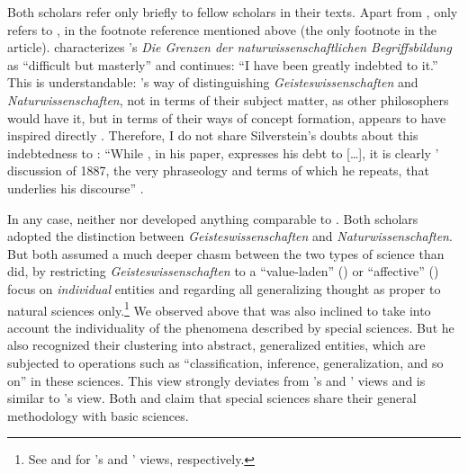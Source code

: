 \documentclass[output=paper]{langscibook}
\begin{document}
Both scholars refer only briefly to fellow scholars in their texts. Apart from {\Kroeber}, {\Sapir} only refers to {\Rickert}, in the footnote reference mentioned above (the only footnote in the article). {\Sapir} characterizes {\Rickert}'s \emph{Die Grenzen der naturwissenschaftlichen Begriffsbildung} as ``difficult but masterly'' and continues: ``I have been greatly indebted to it.'' This is understandable: {\Rickert}'s way of distinguishing \emph{Geisteswissenschaften} and \emph{Naturwissenschaften}, not in terms of their subject matter, as other philosophers would have it, but in terms of their ways of concept formation, appears to have inspired {\Sapir} directly \citep[cf.][]{Anchor1967}.  Therefore, I do not share Silverstein's doubts about this indebtedness to {\Rickert}: ``While {\Sapir}, in his paper, expresses his debt to {\Rickert} […], it is clearly {\Boas}' discussion of 1887, the very phraseology and terms of which he repeats, that underlies his discourse'' \citep[70, fn.5]{Silverstein1986}.\label{q:elffers:silversteinref}

In any case, neither {\Rickert} nor {\Boas} developed anything comparable to . Both scholars adopted the distinction between \emph{Geisteswissenschaf\-ten} and \emph{Naturwissenschaften}. But both assumed a much deeper chasm between the two types of science than {\Sapir} did, by restricting \emph{Geisteswissenschaften} to a ``value-laden'' ({\Rickert}) or ``affective'' ({\Boas}) focus on \emph{individual} entities and regarding all generalizing thought as proper to natural sciences only.\footnote{See \citet{Anchor1967}  and \citet{Silverstein1986} for {\Rickert}'s and {\Boas}' views, respectively.} We observed above that {\Sapir} was also inclined to take into account the individuality of the phenomena described by special sciences. But he also recognized their clustering into abstract, generalized entities, which are subjected to operations such as ``classification, inference, generalization, and so on'' in these sciences. This view strongly deviates from {\Rickert}'s and {\Boas}' views and is similar to {\Fodor}'s view. Both {\Sapir} and {\Fodor} claim that special sciences share their general methodology with basic sciences.
\end{document}

